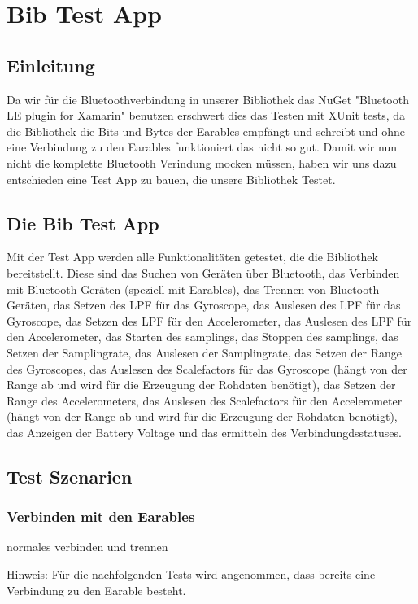 \documentclass[a4paper,12pt]{article}
\begin{document}
\section{Bib Test App}

\subsection{Einleitung}

Da wir für die Bluetoothverbindung in unserer Bibliothek das NuGet "Bluetooth LE plugin for Xamarin" benutzen erschwert dies das Testen mit XUnit tests, da die Bibliothek die Bits und Bytes der Earables empfängt und schreibt und ohne eine Verbindung zu den Earables funktioniert das nicht so gut. Damit wir nun nicht die komplette Bluetooth Verindung mocken müssen, haben wir uns dazu entschieden eine Test App zu bauen, die unsere Bibliothek Testet.

\subsection{Die Bib Test App}
Mit der Test App werden alle Funktionalitäten getestet, die die Bibliothek bereitstellt. Diese sind das Suchen von Geräten über Bluetooth, das Verbinden mit Bluetooth Geräten (speziell mit Earables), das Trennen von Bluetooth Geräten, das Setzen des LPF für das Gyroscope, das Auslesen des LPF für das Gyroscope, das Setzen des LPF für den Accelerometer, das Auslesen des LPF für den Accelerometer, das Starten des samplings, das Stoppen des samplings, das Setzen der Samplingrate, das Auslesen der Samplingrate, das Setzen der Range des Gyroscopes, das Auslesen des Scalefactors für das Gyroscope (hängt von der Range ab und wird für die Erzeugung der Rohdaten benötigt), das Setzen der Range des Accelerometers, das Auslesen des Scalefactors für den Accelerometer (hängt von der Range ab und wird für die Erzeugung der Rohdaten benötigt), das Anzeigen der Battery Voltage und das ermitteln des Verbindungdsstatuses.

\subsection{Test Szenarien}

\subsubsection{Verbinden mit den Earables}
normales verbinden und trennen

Hinweis: Für die nachfolgenden Tests wird angenommen, dass bereits eine Verbindung zu den Earable besteht.
\end{document}
